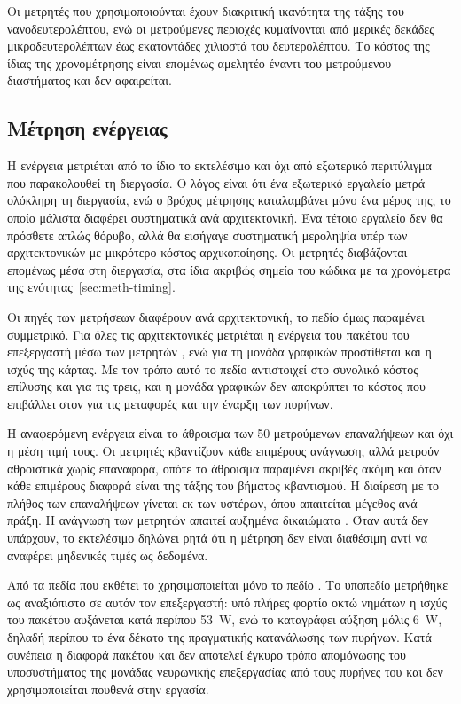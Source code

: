 Οι μετρητές που χρησιμοποιούνται έχουν διακριτική ικανότητα της τάξης του
νανοδευτερολέπτου, ενώ οι μετρούμενες περιοχές κυμαίνονται από μερικές δεκάδες
μικροδευτερολέπτων έως εκατοντάδες χιλιοστά του δευτερολέπτου. Το κόστος της
ίδιας της χρονομέτρησης είναι επομένως αμελητέο έναντι του μετρούμενου
διαστήματος και δεν αφαιρείται.

\subsection{Μέτρηση ενέργειας}
\label{sec:meth-energy}

Η ενέργεια μετριέται από το ίδιο το εκτελέσιμο και όχι από εξωτερικό περιτύλιγμα
που παρακολουθεί τη διεργασία. Ο λόγος είναι ότι ένα εξωτερικό εργαλείο μετρά
ολόκληρη τη διεργασία, ενώ ο βρόχος μέτρησης καταλαμβάνει μόνο ένα μέρος της, το
οποίο μάλιστα διαφέρει συστηματικά ανά αρχιτεκτονική. Ένα τέτοιο εργαλείο δεν θα
πρόσθετε απλώς θόρυβο, αλλά θα εισήγαγε συστηματική μεροληψία υπέρ των αρχιτεκτονικών
με μικρότερο κόστος αρχικοποίησης. Οι μετρητές διαβάζονται επομένως μέσα στη
διεργασία, στα ίδια ακριβώς σημεία του κώδικα με τα χρονόμετρα της
ενότητας~\ref{sec:meth-timing}.

Οι πηγές των μετρήσεων διαφέρουν ανά αρχιτεκτονική, το πεδίο όμως παραμένει
συμμετρικό. Για όλες τις αρχιτεκτονικές μετριέται η ενέργεια του πακέτου του
επεξεργαστή μέσω των μετρητών , ενώ για τη μονάδα γραφικών προστίθεται
και η ισχύς της κάρτας. Με τον τρόπο αυτό το πεδίο  αντιστοιχεί
στο συνολικό κόστος επίλυσης και για τις τρεις, και η μονάδα γραφικών δεν
αποκρύπτει το κόστος που επιβάλλει στον  για τις μεταφορές και την
έναρξη των πυρήνων.

Η αναφερόμενη ενέργεια είναι το άθροισμα των 50 μετρούμενων επαναλήψεων και όχι
η μέση τιμή τους. Οι μετρητές  κβαντίζουν κάθε επιμέρους ανάγνωση, αλλά
μετρούν αθροιστικά χωρίς επαναφορά, οπότε το άθροισμα παραμένει ακριβές ακόμη
και όταν κάθε επιμέρους διαφορά είναι της τάξης του βήματος κβαντισμού. Η
διαίρεση με το πλήθος των επαναλήψεων γίνεται εκ των υστέρων, όπου απαιτείται
μέγεθος ανά πράξη. Η ανάγνωση των μετρητών απαιτεί αυξημένα δικαιώματα . Όταν
αυτά δεν υπάρχουν, το εκτελέσιμο δηλώνει ρητά ότι η μέτρηση δεν είναι διαθέσιμη
αντί να αναφέρει μηδενικές τιμές ως δεδομένα.

Από τα πεδία που εκθέτει το  χρησιμοποιείται μόνο το πεδίο . Το
υποπεδίο  μετρήθηκε ως αναξιόπιστο σε αυτόν τον επεξεργαστή: υπό πλήρες
φορτίο οκτώ νημάτων η ισχύς του πακέτου αυξάνεται κατά περίπου \qty{53}{\watt},
ενώ το  καταγράφει αύξηση μόλις \qty{6}{\watt}, δηλαδή περίπου το ένα
δέκατο της πραγματικής κατανάλωσης των πυρήνων. Κατά συνέπεια η διαφορά
πακέτου και  δεν αποτελεί έγκυρο τρόπο απομόνωσης του υποσυστήματος της
μονάδας νευρωνικής επεξεργασίας από τους πυρήνες του  και δεν
χρησιμοποιείται πουθενά στην εργασία.

